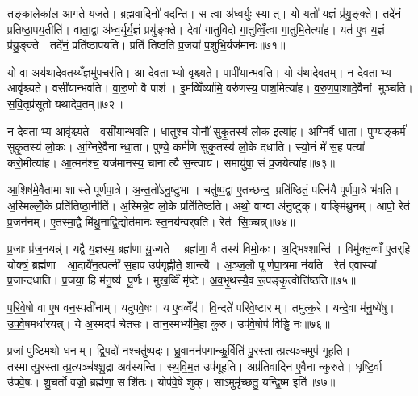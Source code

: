 तङ्का॒लेका॑ल॒ आग॑ते यजते। ब्र॒ह्म॒वा॒दिनो॑ वदन्ति। स त्वा अ॑ध्व॒र्युः स्यात्। यो यतो॑ य॒ज्ञं प्र॑यु॒ङ्क्ते। तदे॑नं प्रतिष्ठा॒पय॒तीति॑। वाता॒द्वा अ॑ध्व॒र्युर्य॒ज्ञं प्रयु॑ङ्क्ते। देवा॑ गातुविदो गा॒तुव्विँ॒त्वा गा॒तुमि॒तेत्या॑ह। यत॑ ए॒व य॒ज्ञं प्र॑यु॒ङ्क्ते। तदे॑नं॒ प्रति॑ष्ठापयति। प्रति॑ तिष्ठति प्र॒जया॑ प॒शुभि॒र्यज॑मानः॥७१॥

यो वा अय॑थादेवतय्यँ॒ज्ञमु॑प॒चर॑ति। आ दे॒वताभ्यो वृश्च्यते। पापी॑यान्भवति। यो य॑थादेव॒तम्। न दे॒वताभ्य॒ आवृ॑श्च्यते। वसी॑यान्भवति। वा॒रु॒णो वै पाश॑। इ॒मव्विँष्या॑मि॒ वरु॑णस्य॒ पाश॒मित्या॑ह। व॒रु॒ण॒पा॒शादे॒वैनां मुञ्चति। स॒वि॒तृप्र॑सूतो यथादेव॒तम्॥७२॥

न दे॒वताभ्य॒ आवृ॑श्च्यते। वसी॑यान्भवति। धा॒तुश्च॒ योनौ॑ सुकृ॒तस्य॑ लो॒क इत्या॑ह। अ॒ग्निर्वै धा॒ता। पुण्य॒ङ्कर्म॑ सुकृ॒तस्य॑ लो॒कः। अ॒ग्निरे॒वैनान्धा॒ता। पुण्ये॒ कर्म॑णि सुकृ॒तस्य॑ लो॒के द॑धाति। स्यो॒नं मे॑ स॒ह पत्या॑ करो॒मीत्या॑ह। आ॒त्मन॑श्च॒ यज॑मानस्य॒ चानात्यै स॒न्त्वाय॑। समायु॑षा॒ सं प्र॒जयेत्या॑ह॥७३॥

आ॒शिष॑मे॒वैतामा शास्ते पूर्णपा॒त्रे। अ॒न्त॒तो॑ऽनु॒ष्टुभा। चतु॑ष्प॒द्वा ए॒तच्छन्द॒ प्रति॑ष्ठितं॒ पत्नि॑यै पूर्णपा॒त्रे भ॑वति। अ॒स्मिल्लोँ॒के प्रति॑तिष्ठा॒नीति॑। अ॒स्मिन्ने॒व लो॒के प्रति॑तिष्ठति। अथो॒ वाग्वा अ॑नु॒ष्टुक्। वाङ्मि॑थु॒नम्। आपो॒ रेत॑ प्र॒जन॑नम्। ए॒तस्मा॒द्वै मि॑थु॒नाद्वि॒द्योत॑मानः स्त॒नय॑न्वर्‌षति। रेत॑ सि॒ञ्चन्न्॥७४॥

प्र॒जाः प्र॑ज॒नयन्न्॑। यद्वै य॒ज्ञस्य॒ ब्रह्म॑णा यु॒ज्यते। ब्रह्म॑णा॒ वै तस्य॑ विमो॒कः। अ॒द्भिश्शान्ति॑। विमु॑क्त॒व्वाँ ए॒तर्‌हि॒ योक्त्रं॒ ब्रह्म॑णा। आ॒दायै॑न॒त्पत्नी॑ स॒हाप उप॑गृह्णीते॒ शान्त्यै। अ॒ञ्ज॒लौ पूर्णपा॒त्रमा न॑यति। रेत॑ ए॒वास्यां प्र॒जान्द॑धाति। प्र॒जया॒ हि म॑नु॒ष्य॑ पू॒र्णः। मुख॒व्विँ मृ॑ष्टे। अ॒व॒भृ॒थस्यै॒व रू॒पङ्कृ॒त्वोत्ति॑ष्ठति॥७५॥\anuvakamend[स॒वि॒तृप्र॑सूतो यथादेव॒तं प्र॒जयेत्या॑ह सि॒ञ्चन्मृ॑ष्ट॒ एक॑ञ्च]

प॒रि॒वे॒षो वा ए॒ष वन॒स्पती॑नाम्। यदु॑पवे॒षः। य ए॒वव्वेँद॑। वि॒न्दते॑ परिवे॒ष्टारम्। तमु॑त्क॒रे। यन्दे॒वा म॑नु॒ष्ये॑षु। उ॒प॒वे॒षमधा॑रयन्न्। ये अ॒स्मदप॑ चेतसः। तान॒स्मभ्य॑मि॒हा कु॑रु। उप॑वे॒षोप॑ विड्ढि नः॥७६॥

प्र॒जां पुष्टि॒मथो॒ धनम्। द्वि॒पदो॑ न॒श्चतु॑ष्पदः। ध्रु॒वानन॑पगान्कु॒र्विति॑ पु॒रस्तात्प्र॒त्यञ्च॒मुप॑ गूहति। तस्मात्पु॒रस्तात्प्र॒त्यञ्च॑श्शू॒द्रा अव॑स्यन्ति। स्थ॒वि॒म॒त उप॑गूहति। अप्र॑तिवादिन ए॒वैनान्कुरुते। धृष्टि॒र्वा उ॑पवे॒षः। शु॒चर्तो वज्रो॒ ब्रह्म॑णा॒ सशि॑तः। योप॑वे॒षे शुक्। साऽमुमृ॑च्छतु॒ यन्द्वि॒ष्म इति॑॥७७॥

